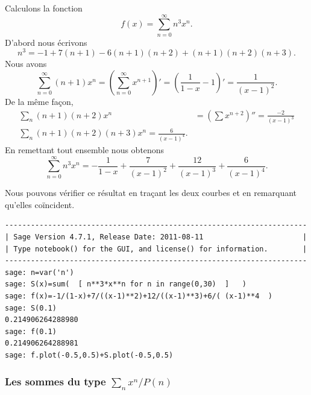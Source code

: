 \begin{example}
	Calculons la fonction
	\begin{equation}
		f(x)=\sum_{n=0}^{\infty}n^3x^n.
	\end{equation}
	D'abord nous écrivons
	\begin{equation}
		n^3=-1+7(n+1)-6(n+1)(n+2)+(n+1)(n+2)(n+3).
	\end{equation}
	Nous avons
	\begin{equation}
		\sum_{n=0}^{\infty}(n+1)x^n=\left( \sum_{n=0}^{\infty}x^{n+1} \right)'=\left( \frac{1}{ 1-x }-1 \right)'=\frac{1}{ (x-1)^2 }.
	\end{equation}
	De la même façon,
	\begin{subequations}
		\begin{align}
			\sum_n (n+1)(n+2)x^n & =\left( \sum x^{n+2} \right)''=\frac{ -2 }{ (x-1)^3 } \\
			\sum_n (n+1)(n+2)(n+3)x^n=\frac{ 6 }{ (x-1)^4 }.
		\end{align}
	\end{subequations}
	En remettant tout ensemble nous obtenons
	\begin{equation}
		\sum_{n=0}^{\infty}n^3x^n=-\frac{1}{ 1-x }+\frac{ 7 }{ (x-1)^2 }+\frac{ 12 }{ (x-1)^3 }+\frac{ 6 }{ (x-1)^4 }.
	\end{equation}

	Nous pouvons vérifier ce résultat en traçant les deux courbes et en remarquant qu'elles coïncident.
	\begin{verbatim}
----------------------------------------------------------------------
| Sage Version 4.7.1, Release Date: 2011-08-11                       |
| Type notebook() for the GUI, and license() for information.        |
----------------------------------------------------------------------
sage: n=var('n')
sage: S(x)=sum(  [ n**3*x**n for n in range(0,30)  ]   )
sage: f(x)=-1/(1-x)+7/((x-1)**2)+12/((x-1)**3)+6/( (x-1)**4  )
sage: S(0.1)
0.214906264288980
sage: f(0.1)
0.214906264288981
sage: f.plot(-0.5,0.5)+S.plot(-0.5,0.5)
\end{verbatim}

\end{example}

\subsubsection{Les sommes du type \texorpdfstring{\(  \sum_nx^n/P(n)\)}{P}}

